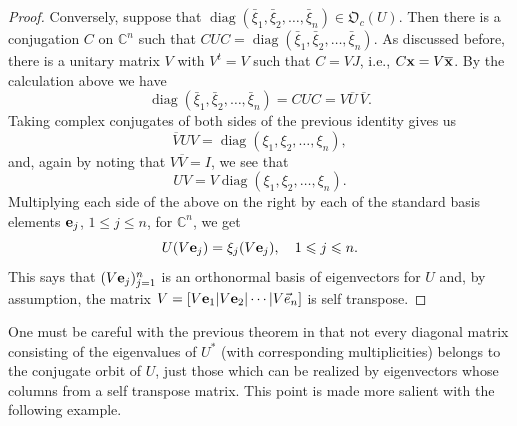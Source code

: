 \documentclass{dis}
\theoremstyle{plain}
\theoremstyle{definition}
\def\C{\mathbb{C}}
\renewcommand{\leq}{\leqslant}
\renewcommand{\vec}[1]{{\bf #1}}
\newcommand{\0}{{\color{lightgray}0}}
\begin{document}
\begin{proof}
Conversely, suppose that $\operatorname{diag}(\bar \xi_1, \bar \xi_2, \ldots, \bar \xi_n) \in \mathfrak{O}_c(U)$. Then there is a conjugation $C$ on $\mathbb{C}^n$ such that $C U C = \operatorname{diag}(\bar \xi_1, \bar \xi_2, \ldots, \bar \xi_n)$. As discussed before,  there is a unitary matrix $V$ with $V^t = V$ such that $C = V J$, i.e., $C \vec{x} = V \overline{\vec{x}}$. By the calculation above we have 
$$\operatorname{diag}(\bar \xi_1, \bar \xi_2, \ldots, \bar \xi_n) = C U C  = V \overline{U} \,\overline{V}.$$ Taking complex conjugates of both sides of the previous identity gives us 
$$\overline{V} U V = \operatorname{diag}(\xi_1, \xi_2, \ldots, \xi_n),$$
and, again by noting that $V \overline{V} = I$, we see that 
\begin{equation}\label{09993397711}
U V = V\operatorname{diag}(\xi_1, \xi_2, \ldots, \xi_n).
\end{equation}
Multiplying  each side of the above on the right by each of the standard basis elements $\vec{e}_j$, $1 \leq j \leq n$, for $\C^n$, we get 
$$U (V \vec{e}_j) = \xi_j (V \vec{e}_j), \quad 1 \leq j \leq n.$$
This says that $(V \vec{e}_j)_{j = 1}^{n}$ is an orthonormal basis of eigenvectors for $U$ and, by assumption,   the matrix 
$V = [V \vec{e}_1| V\vec{e}_2| \cdots | V \Vec{e}_n]$
is self transpose. 
\end{proof}

One must be careful with the previous theorem in that not every diagonal matrix consisting of the eigenvalues of $U^{*}$ (with corresponding multiplicities) belongs to the conjugate orbit of $U$, just those which can be realized by eigenvectors whose columns from a self transpose matrix. This point  is made more salient with  the following example. 
\end{document}
